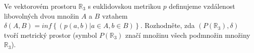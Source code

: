 Ve vektorovém prostoru $\mathbb{R}_{3}$ s euklidovskou metrikou $p$ definujeme
vzdálenost libovolných dvou množin $A$ a $B$ vztahem $\delta(A,B) = inf \left \{  (p(a,b)|a \in A, b \in B )\right \}$. Rozhodněte, zda $(P(\mathbb{R}_{3}), \delta)$
tvoří metrický prostor (symbol $P(\mathbb{R}_{3})$ značí množinu všech podmnožin
množiny $\mathbb{R}_{3}$).
